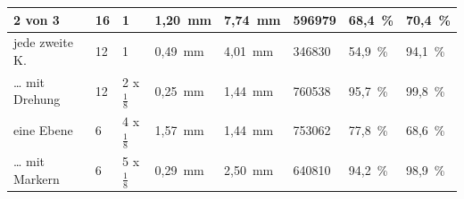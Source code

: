 \documentclass[./00PhotoBox.tex]{subfiles}
\begin{document}
\begin{table}
{\begin{tabular}{l|l|l|l|l|l|l|l}
            2 von 3        & 16                                                                & 1                        & {\color[HTML]{FF0000} 1,20~mm}                                      & {\color[HTML]{FF0000} 7,74~mm}                                      & 596979               & {\color[HTML]{FF0000} 68,4~\%} & {\color[HTML]{FF0000} 70,4~\%} \\ \hline
            jede zweite K. & 12                                                                & 1                        & 0,49~mm                                                             & 4,01~mm                                                             & 346830               & {\color[HTML]{FF0000} 54,9~\%} & 94,1~\%                        \\
            … mit Drehung  & 12                                                                & 2 x $\frac{1}{8}$        & 0,25~mm                                                             & 1,44~mm                                                             & 760538               & 95,7~\%                        & 99,8~\%                        \\ \hline
            eine Ebene     & 6                                                                 & 4 x $\frac{1}{8}$        & {\color[HTML]{FF0000} 1,57~mm}                                      & 1,44~mm                                                             & 753062               & {\color[HTML]{FF0000} 77,8~\%} & {\color[HTML]{FF0000} 68,6~\%} \\
            … mit Markern  & 6                                                                 & 5 x $\frac{1}{8}$        & 0,29~mm                                                             & 2,50~mm                                                             & 640810               & 94,2~\%                        & 98,9~\%
        \end{tabular}
    }
\end{table}
\end{document}
